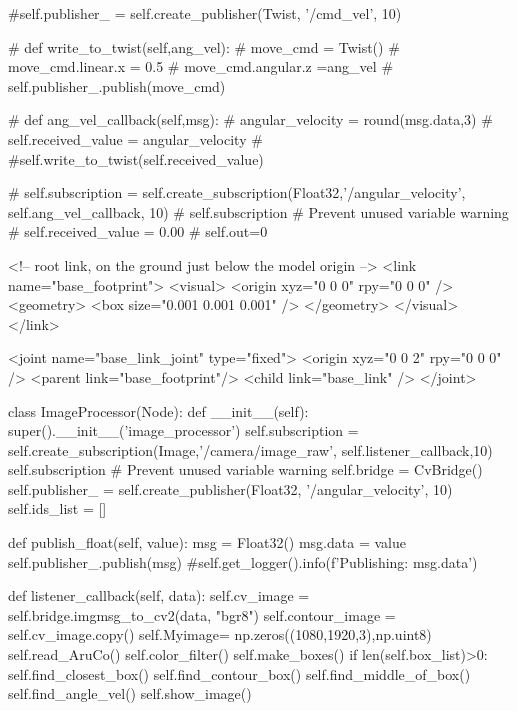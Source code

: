 #self.publisher_ = self.create_publisher(Twist, '/cmd_vel', 10)

# def write_to_twist(self,ang_vel):
#     move_cmd = Twist()
#     move_cmd.linear.x = 0.5
#     move_cmd.angular.z =ang_vel
#     self.publisher_.publish(move_cmd)

# def ang_vel_callback(self,msg):
#     angular_velocity = round(msg.data,3)
#     self.received_value = angular_velocity
#     #self.write_to_twist(self.received_value)
    
# self.subscription = self.create_subscription(Float32,'/angular_velocity', self.ang_vel_callback, 10)
# self.subscription  # Prevent unused variable warning
# self.received_value = 0.00
# self.out=0 





<!-- root link, on the ground just below the model origin -->
<link name="base_footprint">
 <visual>
    <origin xyz="0 0 0" rpy="0 0 0" />
    <geometry>
      <box size="0.001 0.001 0.001" />
    </geometry>
  </visual>
</link>

<joint name="base_link_joint" type="fixed">
  <origin xyz="0 0 2" rpy="0 0 0" />
  <parent link="base_footprint"/>
  <child link="base_link" />
</joint>









class ImageProcessor(Node):
    def __init__(self):
        super().__init__('image_processor') 
        self.subscription = self.create_subscription(Image,'/camera/image_raw',  self.listener_callback,10)
        self.subscription  # Prevent unused variable warning
        self.bridge = CvBridge()
        self.publisher_ = self.create_publisher(Float32, '/angular_velocity', 10)
        self.ids_list = []
  

    def publish_float(self, value):
        msg = Float32()
        msg.data = value
        self.publisher_.publish(msg)
        #self.get_logger().info(f'Publishing: {msg.data}')

    def listener_callback(self, data):
        self.cv_image = self.bridge.imgmsg_to_cv2(data, "bgr8")
        self.contour_image = self.cv_image.copy()
        self.Myimage= np.zeros((1080,1920,3),np.uint8)
        self.read_AruCo()
        self.color_filter()
        self.make_boxes()
        if len(self.box_list)>0:
            self.find_closest_box()
            self.find_contour_box()
            self.find_middle_of_box()
            self.find_angle_vel()
            self.show_image()
         
